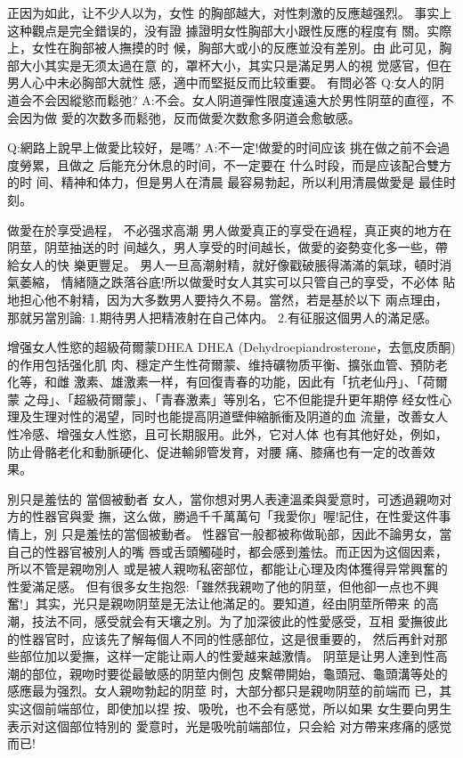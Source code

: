 \documentclass[12pt,UTF8]{ctexbook}
\begin{document}
正因为如此，让不少人以为，女性
的胸部越大，对性刺激的反應越强烈。
事实上这种觀点是完全錯误的，没有證
據證明女性胸部大小跟性反應的程度有
關。实際上，女性在胸部被人撫摸的时
候，胸部大或小的反應並没有差別。由
此可见，胸部大小其实是无须太過在意
的，罩杯大小，其实只是滿足男人的視
觉感官，但在男人心中未必胸部大就性
感，適中而堅挺反而比较重要。
有問必答
Q:女人的阴道会不会因縱慾而鬆弛?
A:不会。女人阴道彈性限度遠遠大於男性阴莖的直徑，不会因为做
愛的次数多而鬆弛，反而做愛次数愈多阴道会愈敏感。

Q:網路上說早上做愛比较好，是嗎?
A:不一定!做愛的时间应该
挑在做之前不会過度勞累，且做之
后能充分休息的时间，不一定要在
什么时段，而是应该配合雙方的时
间、精神和体力，但是男人在清晨
最容易勃起，所以利用清晨做愛是
最佳时刻。

做愛在於享受過程，
不必强求高潮
男人做愛真正的享受在過程，真正爽的地方在阴莖，阴莖抽送的时
间越久，男人享受的时间越长，做愛的姿勢变化多一些，帶給女人的快
樂更豐足。
男人一旦高潮射精，就好像戳破脹得滿滿的氣球，頓时消氣萎縮，
情緒隨之跌落谷底!所以做愛时女人其实可以只管自己的享受，不必体
貼地担心他不射精，因为大多数男人要持久不易。當然，若是基於以下
兩点理由，那就另當別論:
1.期待男人把精液射在自己体内。
2.有征服这個男人的滿足感。

增强女人性慾的超級荷爾蒙DHEA
DHEA (Dehydroepiandrosterone，去氫皮质酮)的作用包括强化肌
肉、穩定产生性荷爾蒙、维持礦物质平衡、擴张血管、預防老化等，和雌
激素、雄激素一样，有回復青春的功能，因此有「抗老仙丹」、「荷爾蒙
之母」、「超級荷爾蒙」、「青春激素」等別名，它不但能提升更年期停
经女性心理及生理对性的渴望，同时也能提高阴道壁伸縮脈衝及阴道的血
流量，改善女人性冷感、增强女人性慾，且可长期服用。此外，它对人体
也有其他好处，例如，防止骨骼老化和動脈硬化、促进輸卵管发育，对腰
痛、膝痛也有一定的改善效果。

別只是羞怯的
當個被動者
女人，當你想对男人表達溫柔與愛意时，可透過親吻对方的性器官與愛
撫，这么做，勝過千千萬萬句「我愛你」喔!記住，在性愛这件事情上，別
只是羞怯的當個被動者。
性器官一般都被称做恥部，因此不論男女，當自己的性器官被別人的嘴
唇或舌頭觸碰时，都会感到羞怯。而正因为这個因素，所以不管是親吻別人
或是被人親吻私密部位，都能让心理及肉体獲得异常興奮的性愛滿足感。
但有很多女生抱怨:「雖然我親吻了他的阴莖，但他卻一点也不興
奮!」其实，光只是親吻阴莖是无法让他滿足的。要知道，经由阴莖所帶来
的高潮，技法不同，感受就会有天壤之別。为了加深彼此的性愛感受，互相
愛撫彼此的性器官时，应该先了解每個人不同的性感部位，这是很重要的，
然后再針对那些部位加以愛撫，这样一定能让兩人的性愛越来越激情。
阴莖是让男人達到性高潮的部位，親吻时要從最敏感的阴莖内側包
皮繫帶開始，龜頭冠、龜頭溝等处的
感應最为强烈。女人親吻勃起的阴莖
时，大部分都只是親吻阴莖的前端而
已，其实这個前端部位，即使加以捏
按、吸吮，也不会有感觉，所以如果
女生要向男生表示对这個部位特別的
愛意时，光是吸吮前端部位，只会給
对方帶来疼痛的感觉而已!
\end{document}
